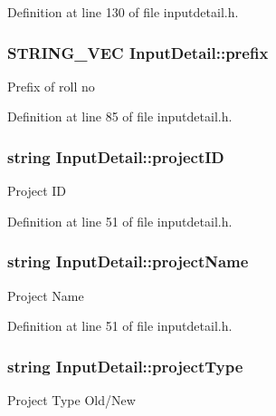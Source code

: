 \-Definition at line 130 of file inputdetail.\-h.

\hypertarget{classInputDetail_af81c2cdf9b1336634bbb33165921d879}{
\subsubsection[{prefix}]{\setlength{\rightskip}{0pt plus 5cm}\-S\-T\-R\-I\-N\-G\-\_\-\-V\-E\-C {\bf \-Input\-Detail\-::prefix}}}\label{db/d6e/classInputDetail_af81c2cdf9b1336634bbb33165921d879}
\-Prefix of roll no 

\-Definition at line 85 of file inputdetail.\-h.

\hypertarget{classInputDetail_a08069ee622c626c038b821ddcc7427b4}{
\subsubsection[{project\-I\-D}]{\setlength{\rightskip}{0pt plus 5cm}string {\bf \-Input\-Detail\-::project\-I\-D}}}\label{db/d6e/classInputDetail_a08069ee622c626c038b821ddcc7427b4}
\-Project \-I\-D 

\-Definition at line 51 of file inputdetail.\-h.

\hypertarget{classInputDetail_aaaf51475a2a4ddbe34e38c96bdb45bad}{
\subsubsection[{project\-Name}]{\setlength{\rightskip}{0pt plus 5cm}string {\bf \-Input\-Detail\-::project\-Name}}}\label{db/d6e/classInputDetail_aaaf51475a2a4ddbe34e38c96bdb45bad}
\-Project \-Name 

\-Definition at line 51 of file inputdetail.\-h.

\hypertarget{classInputDetail_ad2c46fdc8093eb88e01497e55b2e8e4d}{
\subsubsection[{project\-Type}]{\setlength{\rightskip}{0pt plus 5cm}string {\bf \-Input\-Detail\-::project\-Type}}}\label{db/d6e/classInputDetail_ad2c46fdc8093eb88e01497e55b2e8e4d}
\-Project \-Type \-Old/\-New 

